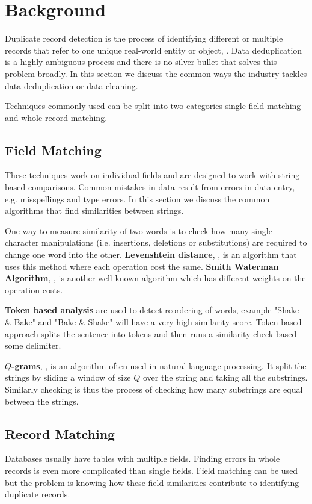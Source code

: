 \documentclass[tog]{acmsiggraph}
\begin{document}
\section{Background}
Duplicate record detection is the process of identifying different or multiple records that refer to one unique real-world entity or object, \textcite{bharambe2012survey}. Data deduplication is a highly ambiguous process and there is no silver bullet that solves this problem broadly. In this section we discuss the common ways the industry tackles data deduplication or data cleaning.

Techniques commonly used can be split into two categories single field matching and whole record matching.

\subsection{Field Matching}
These techniques work on individual fields and are designed to work with string based comparisons. Common mistakes in data result from errors in data entry, e.g. misspellings and type errors. In this section we discuss the common algorithms that find similarities between strings.

One way to measure similarity of two words is to check how many single character manipulations (i.e. insertions, deletions or substitutions) are required to change one word into the other. 
\textbf{Levenshtein distance}, \cite{levenshtein1966binary} , is an algorithm that uses this method where each operation cost the same. \textbf{Smith Waterman Algorithm}, \textcite{smith1981identification}, is another well known algorithm which has different weights on the operation costs.

\textbf{Token based analysis} are used to detect reordering of words, example "Shake \& Bake" and "Bake \& Shake" will have a very high similarity score. Token based approach splits the sentence into tokens and then runs a similarity check   based some delimiter.

\textbf{$Q$-grams}, \textcite{gravano2001approximate}, is an algorithm often used in natural language processing. It split the strings by sliding a window of size $Q$ over the string and taking all the substrings. Similarly checking is thus the process of checking how many substrings are equal between the strings.  

\subsection{Record Matching}
Databases usually have tables with multiple fields. Finding errors in whole records is even more complicated than single fields. Field matching can be used but the problem is knowing how these field similarities contribute to identifying duplicate records.
\end{document}
